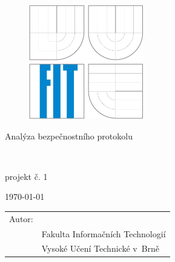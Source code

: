 \begin{titlepage}

\begin{figure}[!h]
  \centering
  \includegraphics[height=5cm]{logo}
\end{figure}

\vfill

\begin{center}
\begin{Large}
Analýza bezpečnostního protokolu\\
\end{Large}
\bigskip
\begin{Huge}
\projname\\
\end{Huge}
\begin{large}
projekt č. 1
\end{large}
\end{center}

\vfill

\begin{center}
\begin{Large}
\today
\end{Large}
\end{center}

\vfill

\begin{flushleft}
\begin{large}
\begin{tabular}{ll}
Autor: & \author, \url{\email} \\
 & Fakulta Informačních Technologií \\
 & Vysoké Učení Technické v~Brně \\
\end{tabular}
\end{large}
\end{flushleft}
\end{titlepage}
